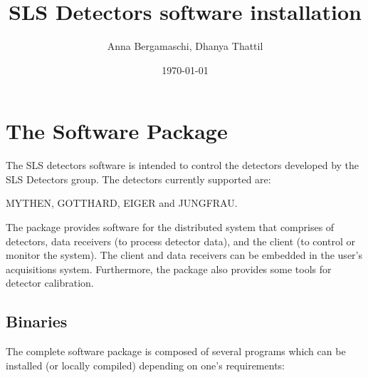 \documentclass{article}
\begin{document}
\title{SLS Detectors software installation}
\author{Anna Bergamaschi, Dhanya Thattil}
\date{\today}
\maketitle
\tableofcontents
\clearpage








\section{The Software Package}
The SLS detectors software is intended to control the detectors developed by
the SLS Detectors group. The detectors currently supported are:

\indent MYTHEN, GOTTHARD, EIGER and JUNGFRAU.


The package provides software for the distributed system that comprises of
detectors, data receivers (to process detector data), and the client (to control
or monitor the system). The client and data receivers can be embedded in
the user's acquisitions system. Furthermore, the package also provides some
tools for detector calibration.

\subsection{Binaries}
\noindent The complete software package is composed of several programs which
can be installed (or locally compiled) depending on one's requirements:
\end{document}

